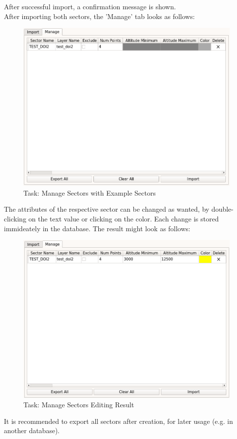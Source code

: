 After successful import, a confirmation message is shown. \\

After importing both sectors, the 'Manage' tab looks as follows:

\begin{figure}[H]
    \includegraphics[width=16cm,frame]{figures/manage_sectors_manage2.png}
  \caption{Task: Manage Sectors with Example Sectors}
\end{figure}

The attributes of the respective sector can be changed as wanted, by double-clicking on the text value or clicking on the color. Each change is stored immideately in the database. The result might look as follows:\\

\begin{figure}[H]
    \includegraphics[width=16cm,frame]{figures/manage_sectors_done.png}
  \caption{Task: Manage Sectors Editing Result}
\end{figure}

It is recommended to export all sectors after creation, for later usage (e.g. in another database).

